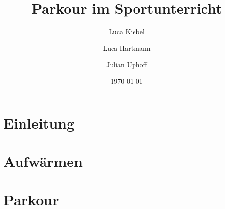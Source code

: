 \documentclass[ngerman,12pt,titlepage]{scrartcl}
\title{Parkour im Sportunterricht}
\author{Luca Kiebel \and Luca Hartmann \and Julian Uphoff}
\date{\today}
\begin{document}
\maketitle
\newpage
	\tableofcontents
\newpage

\section{Einleitung}

\newpage
\section{Aufwärmen}

\newpage
\section{Parkour}
\end{document}
